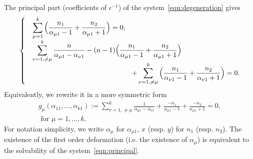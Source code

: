 \documentclass[11pt]{amsart}
\theoremstyle{remark}
\numberwithin{equation}{section}
\begin{document}
The principal part (coefficients of $\epsilon^{-1}$) of the system~\eqref{eqn:degeneration} gives
\[
\begin{cases}
    &\displaystyle\sum_{\mu=1}^k \Big( \frac{n_1}{\alpha_{\mu 1} -1} + \frac{n_2}{\alpha_{\mu 1} + 1} \Big) = 0 ;
    \\
    &\displaystyle\sum_{\nu=1,\neq \mu}^k \frac{n}{\alpha_{\mu 1}-\alpha_{\nu 1}} - (n-1) \Big( \frac{n_1}{\alpha_{\mu 1} -1} + \frac{n_2}{\alpha_{\mu 1} +1} \Big) 
    \\
    &\displaystyle\hspace{50mm}+ \sum_{\nu=1,\neq \mu}^k \Big( \frac{n_1}{\alpha_{\nu 1} -1} + \frac{n_2}{\alpha_{\nu 1}+1} \Big) =0.
\end{cases}
\]
Equivalently, we rewrite it in a more symmetric form
\begin{equation} \label{eqn:principal}
\begin{split}
    g_\mu(\alpha_{11},\dots,\alpha_{k1} ):=\sum_{\nu=1,\neq \mu}^k\frac{1}{\alpha_{\mu 1} - \alpha_{\nu 1}} + \frac{-n_1}{\alpha_{\mu 1} - 1} + \frac{-n_2}{\alpha_{\mu 1} + 1}=0,
    \\
    \mbox{ for $\mu =1,\dots,k.$}
\end{split}
\end{equation}
For notation simplicity, we write $\alpha_{\mu}$ for $\alpha_{\mu 1}$, $x$ (resp. $y$) for $n_1$ (resp. $n_2$). The existence of the first order deformation (i.e. the existence of $\alpha_{\mu}$) is equivalent to the solvability of the system~\eqref{eqn:principal}.
\end{document}

